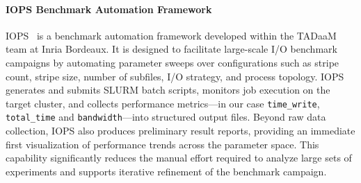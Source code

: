 
\paragraph{IOPS Benchmark Automation Framework}
\label{sec:iops}
IOPS~\cite{iops_tool} is a benchmark automation framework developed within the TADaaM team at Inria
Bordeaux. It is designed to facilitate large-scale I/O benchmark campaigns by
automating parameter sweeps over configurations such as stripe count, stripe size,
number of subfiles, I/O strategy, and process topology. IOPS generates and submits
SLURM batch scripts, monitors job execution on the target cluster, and collects
performance metrics---in our case \texttt{time\_write}, \texttt{total\_time} and
\texttt{bandwidth}---into structured output files. Beyond raw data collection, IOPS also
produces preliminary result reports, providing an immediate first visualization of
performance trends across the parameter space. This capability significantly reduces
the manual effort required to analyze large sets of experiments and supports
iterative refinement of the benchmark campaign.

